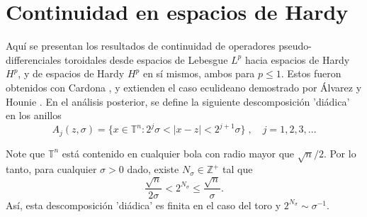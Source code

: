 \section{Continuidad en espacios de Hardy}
Aquí se presentan los resultados de continuidad de operadores pseudo-differenciales toroidales desde espacios de Lebesgue $L^p$ hacia espacios de Hardy $H^p$, y de espacios de Hardy $H^p$ en sí mismos, ambos para $p\leq 1$. Estos fueron obtenidos con Cardona \cite{cardona-martinez-II}, y extienden el caso eculideano demostrado por \'Alvarez y Hounie \cite{alvarez-hounie}. En el análisis posterior, se define la siguiente descomposición 'diádica' en los anillos
\begin{equation}
	A_j(z, \sigma) = \{ x \in \mathbb{T}^n : 2^j\sigma < |x-z|<2^{j+1}\sigma \} \; , \quad j=1, 2, 3, ...
\end{equation}
\begin{remark}
	Note que $\mathbb{T}^n$ está contenido en cualquier bola con radio mayor que $\sqrt{n}/2$. Por lo tanto, para cualquier $\sigma>0$ dado, existe $N_\sigma\in \mathbb{Z}^+$ tal que 
	\begin{equation}
		\frac{\sqrt{n}}{2\sigma} < 2^{N_\sigma} \leq \frac{\sqrt{n}}{\sigma}.
	\end{equation}
	Así, esta descomposición 'diádica' es finita en el caso del toro y $2^{N_\sigma} \sim \sigma^{-1}$.
	\label{rem:N-sigma}
\end{remark}
